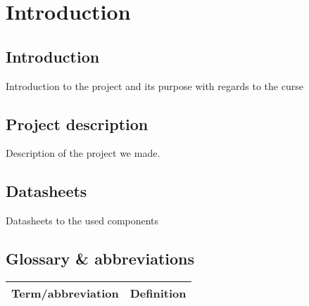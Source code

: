 \chapter{Introduction}

\section{Introduction}
Introduction to the project and its purpose with regards to the curse

\section{Project description}
Description of the project we made.

\section{Datasheets}
Datasheets to the used components

\section{Glossary \& abbreviations}
\begin{table}[H]
\centering
\begin{tabular}{|p{4cm}|p{7cm}|}
\hline
Term/abbreviation & Definition\\ \hline
\end{tabular}
\end{table}


